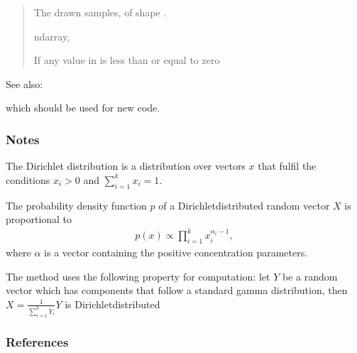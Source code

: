 \documentclass[letterpaper,10pt,english]{sphinxmanual}
\begin{document}
\begin{fulllineitems}
\begin{quote}
\begin{description}
\begin{itemize}
\end{itemize}

\sphinxAtStartPar
{} \textendash{} The drawn samples, of shape .

\sphinxAtStartPar
ndarray,

\sphinxAtStartPar
{} \textendash{} If any value in  is less than or equal to zero

\end{description}\end{quote}


\begin{sphinxseealso}{See also:}
\begin{description}
\sphinxAtStartPar
which should be used for new code.

\end{description}


\end{sphinxseealso}

\subsubsection*{Notes}

\sphinxAtStartPar
The Dirichlet distribution is a distribution over vectors
\(x\) that fulfil the conditions \(x_i>0\) and
\(\sum_{i=1}^k x_i = 1\).

\sphinxAtStartPar
The probability density function \(p\) of a
Dirichlet\sphinxhyphen{}distributed random vector \(X\) is
proportional to
\begin{equation*}
\begin{split}p(x) \propto \prod_{i=1}^{k}{x^{\alpha_i-1}_i},\end{split}
\end{equation*}
\sphinxAtStartPar
where \(\alpha\) is a vector containing the positive
concentration parameters.

\sphinxAtStartPar
The method uses the following property for computation: let \(Y\)
be a random vector which has components that follow a standard gamma
distribution, then \(X = \frac{1}{\sum_{i=1}^k{Y_i}} Y\)
is Dirichlet\sphinxhyphen{}distributed
\subsubsection*{References}

\end{fulllineitems}
\end{document}
